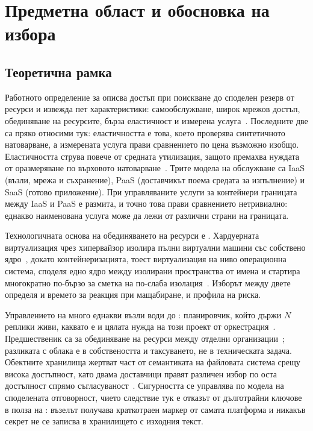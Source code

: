 \section{Предметна област и обосновка на избора}
\label{sec:literature}

\subsection{Теоретична рамка}

Работното определение за  описва достъп при поискване до споделен резерв
от ресурси и извежда пет характеристики: самообслужване, широк мрежов достъп, обединяване на
ресурсите, бърза еластичност и измерена услуга~\cite{nist800145}. Последните две са пряко
относими тук: еластичността е това, което проверява синтетичното натоварване, а измерената услуга
прави сравнението по цена възможно изобщо. Еластичността струва повече от средната утилизация,
защото премахва нуждата от оразмеряване по върховото натоварване~\cite{armbrust2010view}. Трите
модела на обслужване са IaaS (възли, мрежа и съхранение), PaaS (доставчикът поема средата за
изпълнение) и SaaS (готово приложение). При управляваните услуги за контейнери
границата между IaaS и PaaS е размита, и точно това прави сравнението нетривиално: еднакво
наименована услуга може да лежи от различни страни на границата.

Технологичната основа на обединяването на ресурси е . Хардуерната
виртуализация чрез хипервайзор изолира пълни виртуални машини със собствено
ядро~\cite{barham2003xen}, докато контейнеризацията, тоест виртуализация на ниво операционна
система, споделя едно ядро между изолирани пространства от имена и стартира многократно по-бързо
за сметка на по-слаба изолация~\cite{merkel2014docker}. Изборът между двете определя и времето за
реакция при мащабиране, и профила на риска.

Управлението на много еднакви възли води до : планировчик, който
държи $N$ реплики живи, каквато е и цялата нужда на този проект от
оркестрация~\cite{verma2015borg}. Предшественик са  за обединяване на
ресурси между отделни организации~\cite{foster2001grid}; разликата с облака е в собствеността и
таксуването, не в техническата задача. Обектните хранилища жертват част от семантиката на
файловата система срещу висока достъпност, като двама доставчици правят различен избор по оста
достъпност спрямо съгласуваност~\cite{decandia2007dynamo,calder2011azurestorage}. Сигурността се
управлява по модела на споделената отговорност, чието следствие тук е отказът от дълготрайни
ключове в полза на : възелът получава краткотраен маркер от самата
платформа и никакъв секрет не се записва в хранилището с изходния текст.

